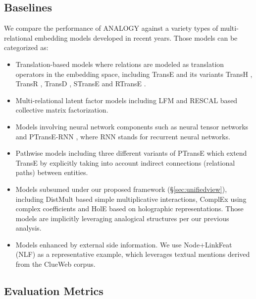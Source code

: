 \documentclass{article}
\begin{document}
\subsection{Baselines}
\label{sec:baselines}
We compare the performance of ANALOGY against a variety types of multi-relational embedding models
developed in recent years. Those models can be categorized as: 
\begin{itemize}
    \item Translation-based models
        where relations are modeled as translation operators in the embedding space,
        including TransE \cite{bordes2013translating} and its variants TransH \cite{wang2014knowledge}, TransR \cite{lin2015learning}, TransD \cite{ji2015knowledge},
        STransE \cite{nguyen2016stranse} and RTransE \cite{garcia2015composing}.
    \item Multi-relational latent factor models including LFM \cite{jenatton2012latent}
        and RESCAL \cite{nickel2011three} based collective matrix factorization.
    \item Models involving neural network components such as neural tensor networks \cite{socher2013reasoning} and PTransE-RNN \cite{lin2015learning},
        where RNN stands for recurrent neural networks.
    \item Pathwise models including three different variants of PTransE \cite{lin2015modeling} which extend TransE by explicitly taking into account
        indirect connections (relational paths) between entities.
    \item Models subsumed under our proposed framework (\S \ref{sec:unifiedview}),
        including DistMult \cite{DBLP:journals/corr/YangYHGD14a} based simple multiplicative interactions, ComplEx \cite{DBLP:conf/icml/TrouillonWRGB16} using complex coefficients
        and HolE \cite{DBLP:conf/aaai/NickelRP16} based on holographic representations.
        Those models are implicitly leveraging analogical structures per our previous analysis.
    \item Models enhanced by external side information.
        We use Node+LinkFeat (NLF) \cite{toutanova2015observed} as a representative example,
        which leverages textual mentions derived from the ClueWeb corpus.
\end{itemize}



\subsection{Evaluation Metrics}
\end{document}
